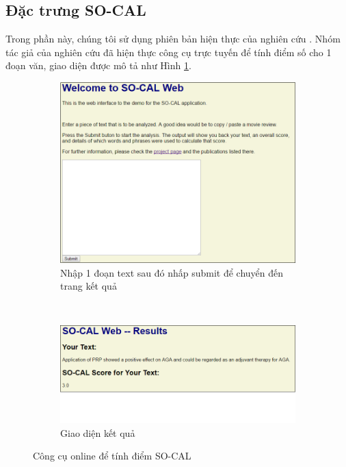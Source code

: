 \subsection*{Đặc trưng SO-CAL}
Trong phần này, chúng tôi sử dụng phiên bản hiện thực của nghiên cứu \cite{taboada2011lexicon}. Nhóm tác giả của nghiên cứu \cite{taboada2011lexicon} đã hiện thực công cụ trực tuyến để tính điểm số cho 1 đoạn văn, giao diện được mô tả như Hình \ref{fig:socal}.\\
\begin{figure}[h]
\centering
\begin{subfigure}[t]{0.45\textwidth}
\includegraphics[scale=0.3]{../hinh/socal.png}
\caption{Nhập 1 đoạn text sau đó nhấp submit để chuyển đến trang kết quả}
\end{subfigure}
~
\begin{subfigure}[t]{0.45\textwidth}
\includegraphics[scale=0.35]{../hinh/socal_result.png}
 \caption{Giao diện kết quả}
\end{subfigure}
\caption{Công cụ online để tính điểm SO-CAL} \label{fig:socal}
\end{figure}

